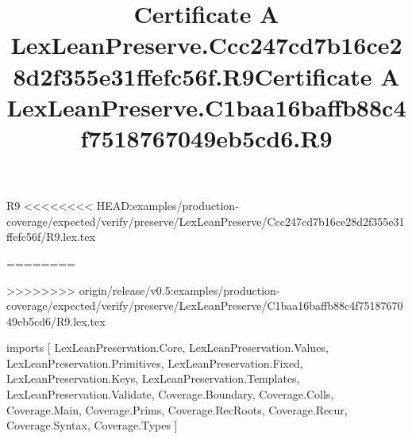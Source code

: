\begin{lexlean}{R9}
<<<<<<<< HEAD:examples/production-coverage/expected/verify/preserve/LexLeanPreserve/Ccc247cd7b16ce28d2f355e31ffefc56f/R9.lex.tex
\title{Certificate A LexLeanPreserve.Ccc247cd7b16ce28d2f355e31ffefc56f.R9}
========
\title{Certificate A LexLeanPreserve.C1baa16baffb88c4f7518767049eb5cd6.R9}
>>>>>>>> origin/release/v0.5:examples/production-coverage/expected/verify/preserve/LexLeanPreserve/C1baa16baffb88c4f7518767049eb5cd6/R9.lex.tex
\begin{coremodule}
imports [
  LexLeanPreservation.Core,
  LexLeanPreservation.Values,
  LexLeanPreservation.Primitives,
  LexLeanPreservation.Fixed,
  LexLeanPreservation.Keys,
  LexLeanPreservation.Templates,
  LexLeanPreservation.Validate,
  Coverage.Boundary,
  Coverage.Colls,
  Coverage.Main,
  Coverage.Prims,
  Coverage.RecRoots,
  Coverage.Recur,
  Coverage.Syntax,
  Coverage.Types
]


\end{coremodule}
\end{lexlean}
